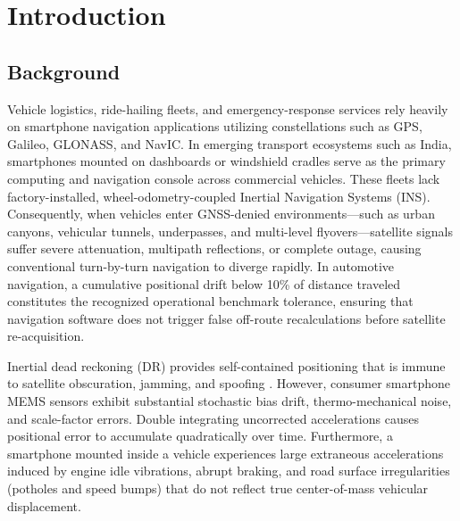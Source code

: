 \documentclass[conference]{IEEEtran}
\begin{document}
\section{Introduction}

\subsection{Background}
Vehicle logistics, ride-hailing fleets, and emergency-response services rely heavily on smartphone navigation applications utilizing constellations such as GPS, Galileo, GLONASS, and NavIC. In emerging transport ecosystems such as India, smartphones mounted on dashboards or windshield cradles serve as the primary computing and navigation console across commercial vehicles. These fleets lack factory-installed, wheel-odometry-coupled Inertial Navigation Systems (INS). Consequently, when vehicles enter GNSS-denied environments---such as urban canyons, vehicular tunnels, underpasses, and multi-level flyovers---satellite signals suffer severe attenuation, multipath reflections, or complete outage, causing conventional turn-by-turn navigation to diverge rapidly. In automotive navigation, a cumulative positional drift below 10\% of distance traveled constitutes the recognized operational benchmark tolerance, ensuring that navigation software does not trigger false off-route recalculations before satellite re-acquisition.

Inertial dead reckoning (DR) provides self-contained positioning that is immune to satellite obscuration, jamming, and spoofing \cite{brossard2020, lawal2024}. However, consumer smartphone MEMS sensors exhibit substantial stochastic bias drift, thermo-mechanical noise, and scale-factor errors. Double integrating uncorrected accelerations causes positional error to accumulate quadratically over time. Furthermore, a smartphone mounted inside a vehicle experiences large extraneous accelerations induced by engine idle vibrations, abrupt braking, and road surface irregularities (potholes and speed bumps) that do not reflect true center-of-mass vehicular displacement.
\end{document}
